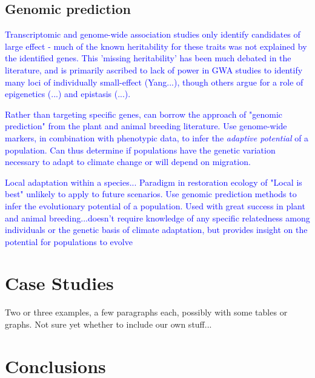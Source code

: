 \documentclass{article}
\newcommand{\Jtxt}[1]{\textcolor{blue}{#1}}
\begin{document}
\subsection*{Genomic prediction}

\Jtxt{Transcriptomic and genome-wide association studies only identify candidates of large effect -  much of the known heritability for these traits was not explained by the identified genes. This 'missing heritability' has been much debated in the literature, and is primarily ascribed to lack of power in GWA studies to identify many loci of individually small-effect (Yang...), though others argue for a role of epigenetics (...) and epistasis (...). }

\Jtxt{Rather than targeting specific genes, can borrow the approach of "genomic prediction" from the plant and animal breeding literature. Use genome-wide markers, in combination with phenotypic data, to infer the \emph{adaptive potential} of a population. Can thus determine if populations have the genetic variation necessary to adapt to climate change or will depend on migration. }

\Jtxt{ Local adaptation within a species...  Paradigm in restoration ecology of "Local is best" unlikely to apply to future scenarios. Use genomic prediction methods to infer the evolutionary potential of a population. Used with great success in plant and animal breeding...doesn't require knowledge of any specific relatedness among individuals or the genetic basis of climate adaptation, but provides insight on the potential for populations to evolve}


\section*{Case Studies}
Two or three examples, a few paragraphs each, possibly with some tables or graphs. Not sure yet whether to include our own stuff...

\section*{Conclusions}

\printbibliography
\end{document}
